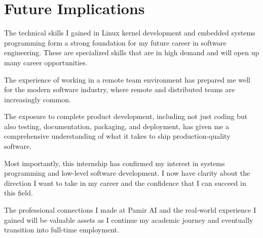 \documentclass[12pt,a4paper]{report}
\begin{document}
\section{Future Implications}

The technical skills I gained in Linux kernel development and embedded systems programming form a strong foundation for my future career in software engineering. These are specialized skills that are in high demand and will open up many career opportunities.

\vspace{0.3cm}

The experience of working in a remote team environment has prepared me well for the modern software industry, where remote and distributed teams are increasingly common.

\vspace{0.3cm}

The exposure to complete product development, including not just coding but also testing, documentation, packaging, and deployment, has given me a comprehensive understanding of what it takes to ship production-quality software.

\vspace{0.3cm}

Most importantly, this internship has confirmed my interest in systems programming and low-level software development. I now have clarity about the direction I want to take in my career and the confidence that I can succeed in this field.

\vspace{0.3cm}

The professional connections I made at Pamir AI and the real-world experience I gained will be valuable assets as I continue my academic journey and eventually transition into full-time employment.
\end{document}
